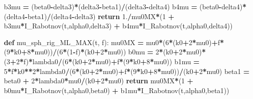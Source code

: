 \documentclass[
  a4paper,
  numbers=noendperiod,
  DIV=12]{scrreprt}
\newenvironment{Shaded}{\begin{snugshade}}{\end{snugshade}}
\newcommand{\ControlFlowTok}[1]{\textcolor[rgb]{0.13,0.29,0.53}{\textbf{#1}}}
\newcommand{\DecValTok}[1]{\textcolor[rgb]{0.00,0.00,0.81}{#1}}
\newcommand{\FloatTok}[1]{\textcolor[rgb]{0.00,0.00,0.81}{#1}}
\newcommand{\KeywordTok}[1]{\textcolor[rgb]{0.13,0.29,0.53}{\textbf{#1}}}
\newcommand{\NormalTok}[1]{#1}
\newcommand{\OperatorTok}[1]{\textcolor[rgb]{0.81,0.36,0.00}{\textbf{#1}}}
\begin{document}
\begin{Shaded}
\begin{Highlighting}[]
\NormalTok{    b3mu }\OperatorTok{=}\NormalTok{ (beta0}\OperatorTok{{-}}\NormalTok{delta3)}\OperatorTok{*}\NormalTok{(delta3}\OperatorTok{{-}}\NormalTok{beta1)}\OperatorTok{/}\NormalTok{(delta3}\OperatorTok{{-}}\NormalTok{delta4)}
\NormalTok{    b4mu }\OperatorTok{=}\NormalTok{ (beta0}\OperatorTok{{-}}\NormalTok{delta4)}\OperatorTok{*}\NormalTok{(delta4}\OperatorTok{{-}}\NormalTok{beta1)}\OperatorTok{/}\NormalTok{(delta4}\OperatorTok{{-}}\NormalTok{delta3)}
    \ControlFlowTok{return} \FloatTok{1.}\OperatorTok{/}\NormalTok{mu0MX}\OperatorTok{*}\NormalTok{(}\DecValTok{1} \OperatorTok{+}\NormalTok{ b3mu}\OperatorTok{*}\NormalTok{I\_Rabotnov(t,alpha0,delta3) }\OperatorTok{+}\NormalTok{ b4mu}\OperatorTok{*}\NormalTok{I\_Rabotnov(t,alpha0,delta4))}

\KeywordTok{def}\NormalTok{ mu\_sph\_rig\_ML\_MAX(t, f):}
\NormalTok{    mu0MX }\OperatorTok{=}\NormalTok{ mu0}\OperatorTok{*}\NormalTok{(}\DecValTok{6}\OperatorTok{*}\NormalTok{(k0}\OperatorTok{+}\DecValTok{2}\OperatorTok{*}\NormalTok{mu0)}\OperatorTok{+}\NormalTok{f}\OperatorTok{*}\NormalTok{(}\DecValTok{9}\OperatorTok{*}\NormalTok{k0}\OperatorTok{+}\DecValTok{8}\OperatorTok{*}\NormalTok{mu0))}\OperatorTok{/}\NormalTok{(}\DecValTok{6}\OperatorTok{*}\NormalTok{(}\DecValTok{1}\OperatorTok{{-}}\NormalTok{f)}\OperatorTok{*}\NormalTok{(k0}\OperatorTok{+}\DecValTok{2}\OperatorTok{*}\NormalTok{mu0))}
\NormalTok{    b0mu  }\OperatorTok{=} \DecValTok{2}\OperatorTok{*}\NormalTok{(k0}\OperatorTok{+}\DecValTok{2}\OperatorTok{*}\NormalTok{mu0)}\OperatorTok{*}\NormalTok{(}\DecValTok{3}\OperatorTok{+}\DecValTok{2}\OperatorTok{*}\NormalTok{f)}\OperatorTok{*}\NormalTok{lambda0}\OperatorTok{/}\NormalTok{(}\DecValTok{6}\OperatorTok{*}\NormalTok{(k0}\OperatorTok{+}\DecValTok{2}\OperatorTok{*}\NormalTok{mu0)}\OperatorTok{+}\NormalTok{f}\OperatorTok{*}\NormalTok{(}\DecValTok{9}\OperatorTok{*}\NormalTok{k0}\OperatorTok{+}\DecValTok{8}\OperatorTok{*}\NormalTok{mu0))}
\NormalTok{    b1mu  }\OperatorTok{=} \DecValTok{5}\OperatorTok{*}\NormalTok{f}\OperatorTok{*}\NormalTok{k0}\OperatorTok{**}\DecValTok{2}\OperatorTok{*}\NormalTok{lambda0}\OperatorTok{/}\NormalTok{(}\DecValTok{6}\OperatorTok{*}\NormalTok{(k0}\OperatorTok{+}\DecValTok{2}\OperatorTok{*}\NormalTok{mu0)}\OperatorTok{+}\NormalTok{f}\OperatorTok{*}\NormalTok{(}\DecValTok{9}\OperatorTok{*}\NormalTok{k0}\OperatorTok{+}\DecValTok{8}\OperatorTok{*}\NormalTok{mu0))}\OperatorTok{/}\NormalTok{(k0}\OperatorTok{+}\DecValTok{2}\OperatorTok{*}\NormalTok{mu0)}
\NormalTok{    beta1 }\OperatorTok{=}\NormalTok{ beta0 }\OperatorTok{+} \DecValTok{2}\OperatorTok{*}\NormalTok{lambda0}\OperatorTok{*}\NormalTok{mu0}\OperatorTok{/}\NormalTok{(k0}\OperatorTok{+}\DecValTok{2}\OperatorTok{*}\NormalTok{mu0)}
    \ControlFlowTok{return}\NormalTok{ mu0MX}\OperatorTok{*}\NormalTok{(}\DecValTok{1} \OperatorTok{+}\NormalTok{ b0mu}\OperatorTok{*}\NormalTok{I\_Rabotnov(t,alpha0,beta0) }\OperatorTok{+}\NormalTok{ b1mu}\OperatorTok{*}\NormalTok{I\_Rabotnov(t,alpha0,beta1))}


\end{Highlighting}
\end{Shaded}
\end{document}
